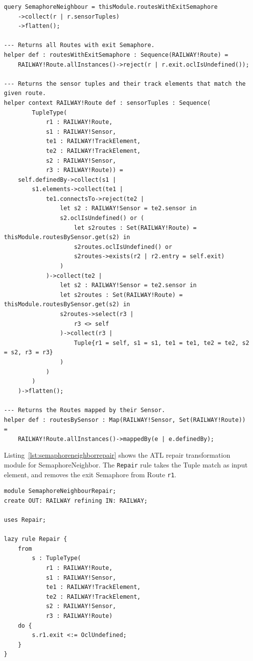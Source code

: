 \documentclass[submission,copyright,creativecommons]{eptcs}
\begin{document}
\lstset{language=atl}
\begin{lstlisting}[float=htb, caption={SemaphoreNeighbor query in ATL}, label=lst:semaphoreneighbor, captionpos=b, frame=tb, belowskip=-10pt]
query SemaphoreNeighbour = thisModule.routesWithExitSemaphore
	->collect(r | r.sensorTuples)
	->flatten();

--- Returns all Routes with exit Semaphore.
helper def : routesWithExitSemaphore : Sequence(RAILWAY!Route) =
	RAILWAY!Route.allInstances()->reject(r | r.exit.oclIsUndefined());

--- Returns the sensor tuples and their track elements that match the given route.
helper context RAILWAY!Route def : sensorTuples : Sequence(
		TupleType(
			r1 : RAILWAY!Route,
			s1 : RAILWAY!Sensor, 
			te1 : RAILWAY!TrackElement, 
			te2 : RAILWAY!TrackElement, 
			s2 : RAILWAY!Sensor,
			r3 : RAILWAY!Route)) =
	self.definedBy->collect(s1 | 
		s1.elements->collect(te1 | 
			te1.connectsTo->reject(te2 | 
				let s2 : RAILWAY!Sensor = te2.sensor in
				s2.oclIsUndefined() or (
					let s2routes : Set(RAILWAY!Route) = thisModule.routesBySensor.get(s2) in
					s2routes.oclIsUndefined() or
					s2routes->exists(r2 | r2.entry = self.exit)
				)
			)->collect(te2 |
				let s2 : RAILWAY!Sensor = te2.sensor in
				let s2routes : Set(RAILWAY!Route) = thisModule.routesBySensor.get(s2) in
				s2routes->select(r3 |
					r3 <> self
				)->collect(r3 |
					Tuple{r1 = self, s1 = s1, te1 = te1, te2 = te2, s2 = s2, r3 = r3}
				)
			)
		)
	)->flatten();

--- Returns the Routes mapped by their Sensor.
helper def : routesBySensor : Map(RAILWAY!Sensor, Set(RAILWAY!Route)) =
	RAILWAY!Route.allInstances()->mappedBy(e | e.definedBy);
\end{lstlisting}

Listing~\ref{lst:semaphoreneighborrepair} shows the ATL repair transformation module for SemaphoreNeighbor. The \texttt{Repair} rule takes the Tuple match as input element, and removes the exit Semaphore from Route \texttt{r1}.

\lstset{language=atl}
\begin{lstlisting}[float=htb, caption={SemaphoreNeighbor repair transformation module in ATL}, label=lst:semaphoreneighborrepair, captionpos=b, frame=tb, belowskip=-10pt]
module SemaphoreNeighbourRepair;
create OUT: RAILWAY refining IN: RAILWAY;

uses Repair;

lazy rule Repair {
	from
		s : TupleType(
			r1 : RAILWAY!Route,
			s1 : RAILWAY!Sensor, 
			te1 : RAILWAY!TrackElement, 
			te2 : RAILWAY!TrackElement, 
			s2 : RAILWAY!Sensor,
			r3 : RAILWAY!Route)
	do {
		s.r1.exit <:= OclUndefined;
	}
}
\end{lstlisting}
\end{document}
